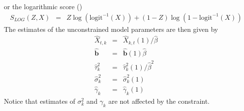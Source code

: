 \documentclass[aoas, preprint]{imsart}
\numberwithin{equation}{section}
\theoremstyle{plain}
\newcommand{\logit}{\text{logit}}
\begin{document}
or the logarithmic score (\citet{good1952rational})
\begin{eqnarray*}
S_{LOG}(Z, X) &=& Z \log\left(\logit^{-1}(X)\right) + (1-Z) \log\left(1-\logit^{-1}(X)\right)
\end{eqnarray*}
The estimates of the unconstrained model parameters are then given by
\begin{eqnarray}
 \hat{X}_{t,k}&=& \hat{X}_{k,t}(1) / \hat{\beta} \nonumber\\
 \hat{\boldsymbol{b}}&=& \hat{\boldsymbol{b}}(1) \hat{\beta} \nonumber\\
   \hat{\tau}_{k}^2&=& \hat{\tau}_{k}^2(1)/ \hat{\beta}^2\nonumber\\
  \hat{\sigma}_{k}^2&=& \hat{\sigma}_{k}^2(1)\nonumber\\
  \hat{\gamma}_{k}&=& \hat{\gamma}_{k}(1)\nonumber
\end{eqnarray}
Notice that estimates of $\sigma^2_k$ and $\gamma_k$ are not affected by the constraint.
\end{document}
